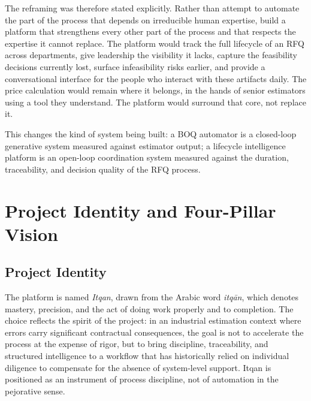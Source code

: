 The reframing was therefore stated explicitly. Rather than attempt to automate the part of the process that depends on irreducible human expertise, build a platform that strengthens every other part of the process and that respects the expertise it cannot replace. The platform would track the full lifecycle of an RFQ across departments, give leadership the visibility it lacks, capture the feasibility decisions currently lost, surface infeasibility risks earlier, and provide a conversational interface for the people who interact with these artifacts daily. The price calculation would remain where it belongs, in the hands of senior estimators using a tool they understand. The platform would surround that core, not replace it.

This changes the kind of system being built: a BOQ automator is a closed-loop generative system measured against estimator output; a lifecycle intelligence platform is an open-loop coordination system measured against the duration, traceability, and decision quality of the RFQ process.

\section{Project Identity and Four-Pillar Vision}
\subsection{Project Identity}
The platform is named \textit{Itqan}, drawn from the Arabic word \textit{itqān}, which denotes mastery, precision, and the act of doing work properly and to completion. The choice reflects the spirit of the project: in an industrial estimation context where errors carry significant contractual consequences, the goal is not to accelerate the process at the expense of rigor, but to bring discipline, traceability, and structured intelligence to a workflow that has historically relied on individual diligence to compensate for the absence of system-level support. Itqan is positioned as an instrument of process discipline, not of automation in the pejorative sense.

